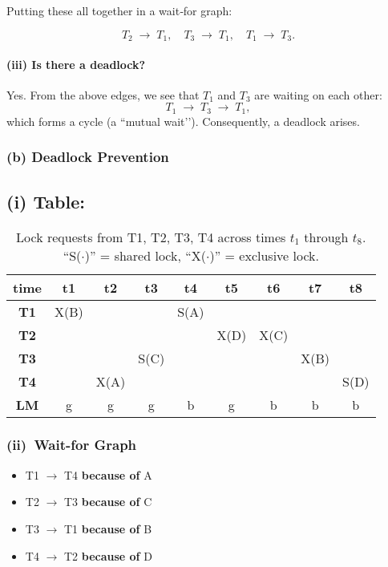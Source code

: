 \documentclass[11pt]{article}
\begin{document}
\noindent
Putting these all together in a wait‐for graph:

\[
  T_2 \;\longrightarrow\; T_1,\quad 
  T_3 \;\longrightarrow\; T_1,\quad
  T_1 \;\longrightarrow\; T_3.
\]

\paragraph{(iii) Is there a deadlock?}

Yes.  From the above edges, we see that \(T_1\) and \(T_3\) are waiting on each other:
\[
  T_1 \;\longrightarrow\; T_3 \;\longrightarrow\; T_1,
\]
which forms a cycle (a ``mutual wait’’).  Consequently, a deadlock arises. 

\subsubsection*{(b) \; Deadlock Prevention}

\subsection*{(i) Table:}

\begin{table}[!htbp]
\centering
\begin{tabular}{c|cccccccc}
\textbf{time} & \textbf{t1} & \textbf{t2} & \textbf{t3} & \textbf{t4} & \textbf{t5} & \textbf{t6} & \textbf{t7} & \textbf{t8} \\
\hline
\textbf{T1} & X(B) &        &      & S(A)   &        &        &        &        \\
\textbf{T2} &      &        &      &        & X(D)   & X(C)   &        &        \\
\textbf{T3} &      &        & S(C) &        &        &        & X(B)   &        \\
\textbf{T4} &      & X(A)   &      &        &        &        &        & S(D)   \\
\hline
\textbf{LM} & g    & g      & g    & b      & g      & b      & b      & b
\end{tabular}
\caption{Lock requests from T1, T2, T3, T4 across times \(t_1\) through \(t_8\). 
``S(\(\cdot\))'' = shared lock, ``X(\(\cdot\))'' = exclusive lock.}
\end{table}

\subsubsection*{(ii)~Wait-for Graph}
\begin{itemize}
  \item T1 $\rightarrow$ T4 \textbf{because of} A
  \item T2 $\rightarrow$ T3 \textbf{because of} C
  \item T3 $\rightarrow$ T1 \textbf{because of} B
  \item T4 $\rightarrow$ T2 \textbf{because of} D
\end{itemize}
\end{document}
